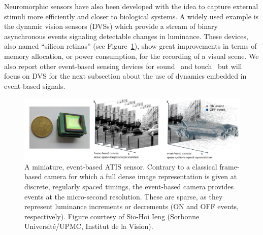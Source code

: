 \documentclass[brainsci, %
               review,accept,pdftex,moreauthors
               ]{Definitions/mdpi}
\begin{document}
%
Neuromorphic sensors have also been developed with the idea to capture external stimuli more efficiently and closer to biological systems. A widely used example is the dynamic vision sensors (DVSs) which provide a stream of binary asynchronous events signaling detectable changes in luminance. These devices, also named ``silicon retinas'' (see Figure~\ref{fig:silicon_retina}), show great improvements in terms of memory allocation, or power consumption, for the recording of a visual scene. We also report other event-based sensing devices for sound~\citep{chan_aer_2007} and touch~\citep{haessig_event-based_2020} but will focus on DVS for the next subsection about the use of dynamics embedded in event-based signals. 

\begin{figure}[H]
\centering
\includegraphics[width=0.980\linewidth]{figures/event_driven_computations.png}
\caption{
 A miniature, event-based ATIS sensor.
 Contrary to a classical frame-based camera for which a full dense image representation is given at discrete, regularly spaced timings, the event-based camera provides events at the micro-second resolution. These are sparse, as they represent luminance increments or decrements (ON and OFF events, respectively). Figure courtesy of Sio-Hoi Ieng (Sorbonne Université/UPMC, Institut de la Vision).}\label{fig:silicon_retina}
\end{figure}

%
\end{document}
